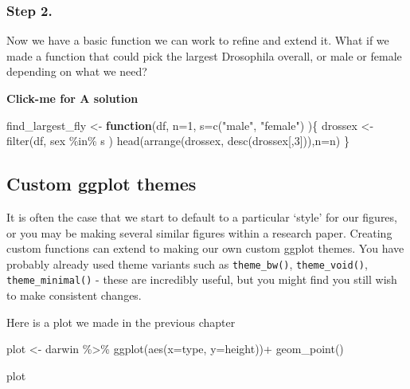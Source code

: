 \documentclass[
]{book}
\newenvironment{Shaded}{\begin{snugshade}}{\end{snugshade}}
\newcommand{\AttributeTok}[1]{\textcolor[rgb]{0.77,0.63,0.00}{#1}}
\newcommand{\ControlFlowTok}[1]{\textcolor[rgb]{0.13,0.29,0.53}{\textbf{#1}}}
\newcommand{\DecValTok}[1]{\textcolor[rgb]{0.00,0.00,0.81}{#1}}
\newcommand{\FunctionTok}[1]{\textcolor[rgb]{0.00,0.00,0.00}{#1}}
\newcommand{\NormalTok}[1]{#1}
\newcommand{\OtherTok}[1]{\textcolor[rgb]{0.56,0.35,0.01}{#1}}
\newcommand{\SpecialCharTok}[1]{\textcolor[rgb]{0.00,0.00,0.00}{#1}}
\newcommand{\StringTok}[1]{\textcolor[rgb]{0.31,0.60,0.02}{#1}}
\begin{document}
\hypertarget{step-2.}{%
\subsubsection{Step 2.}\label{step-2.}}

Now we have a basic function we can work to refine and extend it. What if we made a function that could pick the largest Drosophila overall, or male or female depending on what we need?

\textbf{Click-me for A solution}

\begin{Shaded}
\begin{Highlighting}[]
\NormalTok{find\_largest\_fly }\OtherTok{\textless{}{-}} \ControlFlowTok{function}\NormalTok{(df, }\AttributeTok{n=}\DecValTok{1}\NormalTok{, }\AttributeTok{s=}\FunctionTok{c}\NormalTok{(}\StringTok{"male"}\NormalTok{, }\StringTok{"female"}\NormalTok{) )\{}
\NormalTok{  drossex }\OtherTok{\textless{}{-}} \FunctionTok{filter}\NormalTok{(df, sex }\SpecialCharTok{\%in\%}\NormalTok{ s )}
  \FunctionTok{head}\NormalTok{(}\FunctionTok{arrange}\NormalTok{(drossex, }\FunctionTok{desc}\NormalTok{(drossex[,}\DecValTok{3}\NormalTok{])),}\AttributeTok{n=}\NormalTok{n)}
\NormalTok{\}}
\end{Highlighting}
\end{Shaded}

\hypertarget{custom-ggplot-themes}{%
\subsection{Custom ggplot themes}\label{custom-ggplot-themes}}

It is often the case that we start to default to a particular `style' for our figures, or you may be making several similar figures within a research paper. Creating custom functions can extend to making our own custom ggplot themes. You have probably already used theme variants such as \texttt{theme\_bw()}, \texttt{theme\_void()}, \texttt{theme\_minimal()} - these are incredibly useful, but you might find you still wish to make consistent changes.

Here is a plot we made in the previous chapter

\begin{Shaded}
\begin{Highlighting}[]
\NormalTok{plot }\OtherTok{\textless{}{-}}\NormalTok{ darwin }\SpecialCharTok{\%\textgreater{}\%} 
  \FunctionTok{ggplot}\NormalTok{(}\FunctionTok{aes}\NormalTok{(}\AttributeTok{x=}\NormalTok{type,}
         \AttributeTok{y=}\NormalTok{height))}\SpecialCharTok{+}
  \FunctionTok{geom\_point}\NormalTok{()}

\NormalTok{plot}
\end{Highlighting}
\end{Shaded}
\end{document}
